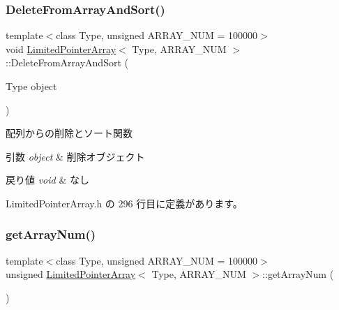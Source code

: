 \subsubsection{\texorpdfstring{Delete\+From\+Array\+And\+Sort()}{DeleteFromArrayAndSort()}}
{\footnotesize\ttfamily template$<$class Type, unsigned A\+R\+R\+A\+Y\+\_\+\+N\+UM = 100000$>$ \\
void \mbox{\hyperlink{class_limited_pointer_array}{Limited\+Pointer\+Array}}$<$ Type, A\+R\+R\+A\+Y\+\_\+\+N\+UM $>$\+::Delete\+From\+Array\+And\+Sort (\begin{DoxyParamCaption}\item[{Type}]{object }\end{DoxyParamCaption})\hspace{0.3cm}{\ttfamily [inline]}}



配列からの削除とソート関数 


\begin{DoxyParams}{引数}
{\em object} & 削除オブジェクト \\
\hline
\end{DoxyParams}

\begin{DoxyRetVals}{戻り値}
{\em void} & なし \\
\hline
\end{DoxyRetVals}


 Limited\+Pointer\+Array.\+h の 296 行目に定義があります。

\mbox{\label{class_limited_pointer_array_ae56197ccd1db87ce3a8d566918e74b25}} 
\subsubsection{\texorpdfstring{get\+Array\+Num()}{getArrayNum()}}
{\footnotesize\ttfamily template$<$class Type, unsigned A\+R\+R\+A\+Y\+\_\+\+N\+UM = 100000$>$ \\
unsigned \mbox{\hyperlink{class_limited_pointer_array}{Limited\+Pointer\+Array}}$<$ Type, A\+R\+R\+A\+Y\+\_\+\+N\+UM $>$\+::get\+Array\+Num (\begin{DoxyParamCaption}{ }\end{DoxyParamCaption})\hspace{0.3cm}{\ttfamily [inline]}}



